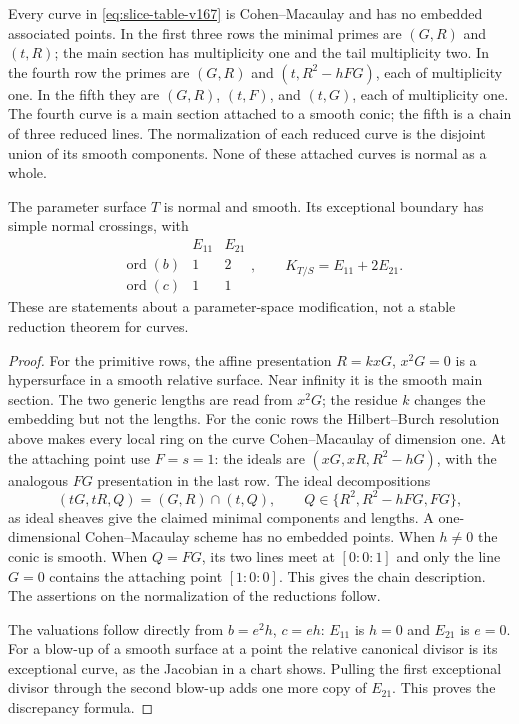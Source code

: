 \begin{proposition}
\label{prop:slice-geometry-v167}
Every curve in \eqref{eq:slice-table-v167} is Cohen--Macaulay and
has no embedded associated points. In the first three rows the
minimal primes are $(G,R)$ and $(t,R)$; the main section has
multiplicity one and the tail multiplicity two. In the fourth
row the primes are $(G,R)$ and $(t,R^2-hFG)$, each of multiplicity
one. In the fifth they are $(G,R)$, $(t,F)$, and $(t,G)$,
each of multiplicity one. The fourth curve is a main section
attached to a smooth conic; the fifth is a chain of three reduced
lines. The normalization of each reduced curve is the disjoint
union of its smooth components. None of these attached curves
is normal as a whole.

The parameter surface $T$ is normal and smooth. Its exceptional
boundary has simple normal crossings, with
\[
 \begin{array}{c|cc} &E_{11}&E_{21}\\ \hline
 \operatorname{ord}(b)&1&2\\
 \operatorname{ord}(c)&1&1
 \end{array},\qquad
 K_{T/S}=E_{11}+2E_{21}.
\]
These are statements about a parameter-space modification, not a
stable reduction theorem for curves.
\end{proposition}
\begin{proof}
For the primitive rows, the affine presentation
$R=kxG$, $x^2G=0$ is a hypersurface in a smooth relative surface.
Near infinity it is the smooth main section. The two generic
lengths are read from $x^2G$; the residue $k$ changes the
embedding but not the lengths. For the conic rows the
Hilbert--Burch resolution above makes every local ring on the
curve Cohen--Macaulay of dimension one. At the attaching point
use $F=s=1$: the ideals are $(xG,xR,R^2-hG)$, with the analogous
$FG$ presentation in the last row. The ideal decompositions
\[
 (tG,tR,Q)=(G,R)\cap(t,Q),\qquad Q\in\{R^2,R^2-hFG,FG\},
\]
as ideal sheaves give the claimed minimal components and lengths.
A one-dimensional Cohen--Macaulay scheme has no embedded points.
When $h\ne0$ the conic is smooth. When $Q=FG$, its two lines
meet at $[0:0:1]$ and only the line $G=0$ contains the attaching
point $[1:0:0]$. This gives the chain description. The assertions
on the normalization of the reductions follow.

The valuations follow directly from $b=e^2h$, $c=eh$:
$E_{11}$ is $h=0$ and $E_{21}$ is $e=0$. For a blow-up of a
smooth surface at a point the relative canonical divisor is its
exceptional curve, as the Jacobian in a chart shows. Pulling the
first exceptional divisor through the second blow-up adds one
more copy of $E_{21}$. This proves the discrepancy formula.
\end{proof}


